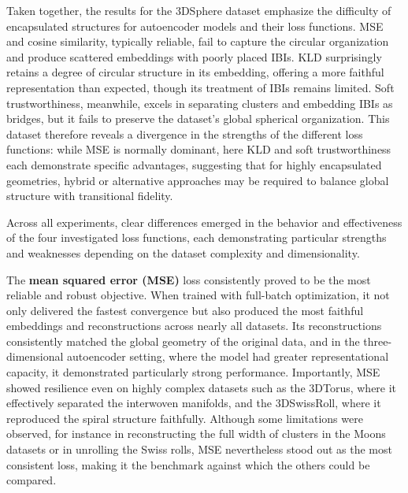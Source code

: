 Taken together, the results for the 3DSphere dataset emphasize the difficulty of encapsulated structures for autoencoder models and their loss functions. MSE and cosine similarity, typically reliable, fail to capture the circular organization and produce scattered embeddings with poorly placed IBIs. KLD surprisingly retains a degree of circular structure in its embedding, offering a more faithful representation than expected, though its treatment of IBIs remains limited. Soft trustworthiness, meanwhile, excels in separating clusters and embedding IBIs as bridges, but it fails to preserve the dataset’s global spherical organization. This dataset therefore reveals a divergence in the strengths of the different loss functions: while MSE is normally dominant, here KLD and soft trustworthiness each demonstrate specific advantages, suggesting that for highly encapsulated geometries, hybrid or alternative approaches may be required to balance global structure with transitional fidelity.
\newline

Across all experiments, clear differences emerged in the behavior and effectiveness of the four investigated loss functions, each demonstrating particular strengths and weaknesses depending on the dataset complexity and dimensionality.

The \textbf{mean squared error (MSE)} loss consistently proved to be the most reliable and robust objective. When trained with full-batch optimization, it not only delivered the fastest convergence but also produced the most faithful embeddings and reconstructions across nearly all datasets. Its reconstructions consistently matched the global geometry of the original data, and in the three-dimensional autoencoder setting, where the model had greater representational capacity, it demonstrated particularly strong performance. Importantly, MSE showed resilience even on highly complex datasets such as the 3DTorus, where it effectively separated the interwoven manifolds, and the 3DSwissRoll, where it reproduced the spiral structure faithfully. Although some limitations were observed, for instance in reconstructing the full width of clusters in the Moons datasets or in unrolling the Swiss rolls, MSE nevertheless stood out as the most consistent loss, making it the benchmark against which the others could be compared.

